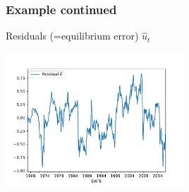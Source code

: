 \begin{frame}\frametitle{Example continued}
\begin{block}{Residuals (=equilibrium error) $\hat{u}_t$}
\begin{center}
\includegraphics[width=0.5\textwidth]{uhat}
\end{center}
\end{block}
\end{frame}

